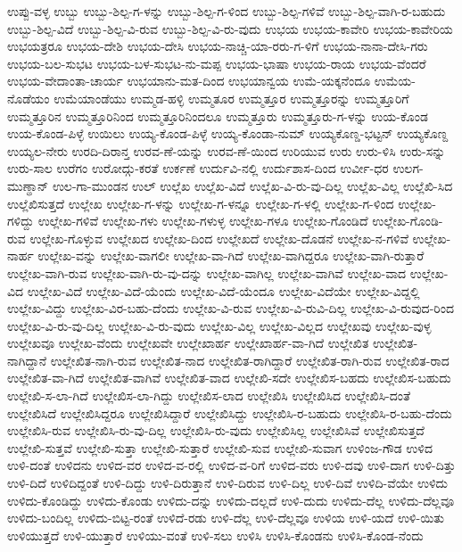 ಉಪ್ಪು-ವಳ್ಳ
ಉಬ್ಬು
ಉಬ್ಬು-ಶಿಲ್ಪ-ಗ-ಳನ್ನು
ಉಬ್ಬು-ಶಿಲ್ಪ-ಗ-ಳಿಂದ
ಉಬ್ಬು-ಶಿಲ್ಪ-ಗಳಿವೆ
ಉಬ್ಬು-ಶಿಲ್ಪ-ವಾಗಿ-ರ-ಬಹುದು
ಉಬ್ಬು-ಶಿಲ್ಪ-ವಿದೆ
ಉಬ್ಬು-ಶಿಲ್ಪ-ವಿ-ರುವ
ಉಬ್ಬು-ಶಿಲ್ಪ-ವಿ-ರು-ವುದು
ಉಭಯ
ಉಭಯ-ಕಾವೇರಿ
ಉಭಯ-ಕಾವೇರಿಯ
ಉಭಯತ್ರರೂ
ಉಭಯ-ದೇಶಿ
ಉಭಯ-ದೇಸಿ
ಉಭಯ-ನಾಚ್ಚಿ-ಯಾ-ರರು-ಗ-ಳಿಗೆ
ಉಭಯ-ನಾನಾ-ದೇಸಿ-ಗರು
ಉಭಯ-ಬಲ-ಸುಭಟ
ಉಭಯ-ಬಳ-ಸುಭಟ-ನು-ಮಪ್ಪ
ಉಭಯ-ಭಾಷಾ
ಉಭಯ-ರಾಯ
ಉಭಯ-ವೆಂದರೆ
ಉಭಯ-ವೇದಾಂತಾ-ಚಾರ್ಯ
ಉಭಯಾನು-ಮತ-ದಿಂದ
ಉಭಯಾನ್ವಯ
ಉಮೆ-ಯಕ್ಕನೆಂದೂ
ಉಮೆಯ-ನೊಡೆಯಂ
ಉಮೆಯಾಂಡೆಯು
ಉಮ್ಮಡ-ಹಳ್ಳಿ
ಉಮ್ಮತೂರ
ಉಮ್ಮತ್ತೂರ
ಉಮ್ಮತ್ತೂರನ್ನು
ಉಮ್ಮತ್ತೂರಿಗೆ
ಉಮ್ಮತ್ತೂರಿನ
ಉಮ್ಮತ್ತೂರಿನಿಂದ
ಉಮ್ಮತ್ತೂರಿನಿಂದಲೂ
ಉಮ್ಮತ್ತೂರು
ಉಮ್ಮತ್ತೂರು-ಗ-ಳನ್ನು
ಉಯ-ಕೊಂಡ
ಉಯ-ಕೊಂಡ-ಪಿಳ್ಳೆ
ಉಯಿಲು
ಉಯ್ಯ-ಕೊಂಡ-ಪಿಳ್ಳೆ
ಉಯ್ಯ-ಕೊಂಡಾ-ನುಮ್
ಉಯ್ಯಕೊಣ್ಡ-ಭಟ್ಟನ್
ಉಯ್ಯಕೊಣ್ದ
ಉಯ್ಯಲ-ನೇರು
ಉರದಿ-ದಿರಾನ್ತ
ಉರವ-ಣೆ-ಯನ್ನು
ಉರವ-ಣೆ-ಯಿಂದ
ಉರಿಯುವ
ಉರು
ಉರು-ಳಿಸಿ
ಉರು-ಸನ್ನು
ಉರು-ಸಾಲ
ಉರೆಗಂ
ಉರೋದ್ಗು-ಕರತೆ
ಉರ್ಕಣೆ
ಉರ್ದುವಿ-ನಲ್ಲಿ
ಉರ್ದುಶಾಸ-ದಿಂದ
ಉರ್ವೀ-ಧರ
ಉಲಗ-ಮುಣ್ಢಾನ್
ಉಲ-ಗಾ-ಮುಂಡನ
ಉಲ್
ಉಲ್ಲೆಖ
ಉಲ್ಲೆಖ-ವಿದೆ
ಉಲ್ಲೆಖ-ವಿ-ರು-ವು-ದಿಲ್ಲ
ಉಲ್ಲೆಖ-ವಿಲ್ಲ
ಉಲ್ಲೆಖಿ-ಸಿದ
ಉಲ್ಲೆಖಿಸುತ್ತದೆ
ಉಲ್ಲೇಖ
ಉಲ್ಲೇಖ-ಗ-ಳನ್ನು
ಉಲ್ಲೇಖ-ಗ-ಳನ್ನೂ
ಉಲ್ಲೇಖ-ಗ-ಳಲ್ಲಿ
ಉಲ್ಲೇಖ-ಗ-ಳಿಂದ
ಉಲ್ಲೇಖ-ಗಳಿದ್ದು
ಉಲ್ಲೇಖ-ಗಳಿವೆ
ಉಲ್ಲೇಖ-ಗಳು
ಉಲ್ಲೇಖ-ಗಳುಳ್ಳ
ಉಲ್ಲೇಖ-ಗಳೂ
ಉಲ್ಲೇಖ-ಗೊಂಡಿದೆ
ಉಲ್ಲೇಖ-ಗೊಂಡಿ-ರುವ
ಉಲ್ಲೇಖ-ಗೊಳ್ಳುವ
ಉಲ್ಲೇಖದ
ಉಲ್ಲೇಖ-ದಿಂದ
ಉಲ್ಲೇಖದೆ
ಉಲ್ಲೇಖ-ದೊಡನೆ
ಉಲ್ಲೇಖ-ನ-ಗಳಿವೆ
ಉಲ್ಲೇಖ-ನಾರ್ಹ
ಉಲ್ಲೇಖ-ವನ್ನು
ಉಲ್ಲೇಖ-ವಾಗಲೀ
ಉಲ್ಲೇಖ-ವಾ-ಗಿದೆ
ಉಲ್ಲೇಖ-ವಾಗಿದ್ದರೂ
ಉಲ್ಲೇಖ-ವಾಗಿ-ರುತ್ತಾರೆ
ಉಲ್ಲೇಖ-ವಾಗಿ-ರುವ
ಉಲ್ಲೇಖ-ವಾಗಿ-ರು-ವು-ದನ್ನು
ಉಲ್ಲೇಖ-ವಾಗಿಲ್ಲ
ಉಲ್ಲೇಖ-ವಾಗಿವೆ
ಉಲ್ಲೇಖ-ವಾದ
ಉಲ್ಲೇಖ-ವಿದ
ಉಲ್ಲೇಖ-ವಿದೆ
ಉಲ್ಲೇಖ-ವಿದೆ-ಯೆಂದು
ಉಲ್ಲೇಖ-ವಿದೆ-ಯೆಂದೂ
ಉಲ್ಲೇಖ-ವಿದೆಯೇ
ಉಲ್ಲೇಖ-ವಿದ್ದಲ್ಲಿ
ಉಲ್ಲೇಖ-ವಿದ್ದು
ಉಲ್ಲೇಖ-ವಿರ-ಬಹು-ದೆಂದು
ಉಲ್ಲೇಖ-ವಿ-ರುವ
ಉಲ್ಲೇಖ-ವಿ-ರುವಿ-ದಿಲ್ಲ
ಉಲ್ಲೇಖ-ವಿ-ರುವುದ-ರಿಂದ
ಉಲ್ಲೇಖ-ವಿ-ರು-ವು-ದಿಲ್ಲ
ಉಲ್ಲೇಖ-ವಿ-ರು-ವುದು
ಉಲ್ಲೇಖ-ವಿಲ್ಲ
ಉಲ್ಲೇಖ-ವಿಲ್ಲದ
ಉಲ್ಲೇಖವು
ಉಲ್ಲೇಖ-ವುಳ್ಳ
ಉಲ್ಲೇಖವೂ
ಉಲ್ಲೇಖ-ವೆಂದು
ಉಲ್ಲೇಖವೇ
ಉಲ್ಲೇಖಾರ್ಹ
ಉಲ್ಲೇಖಾರ್ಹ-ವಾ-ಗಿದೆ
ಉಲ್ಲೇಖಿತ
ಉಲ್ಲೇಖಿತ-ನಾಗಿದ್ದಾನೆ
ಉಲ್ಲೇಖಿತ-ನಾಗಿ-ರುವ
ಉಲ್ಲೇಖಿತ-ನಾದ
ಉಲ್ಲೇಖಿತ-ರಾಗಿದ್ದಾರೆ
ಉಲ್ಲೇಖಿತ-ರಾಗಿ-ರುವ
ಉಲ್ಲೇಖಿತ-ರಾದ
ಉಲ್ಲೇಖಿತ-ವಾ-ಗಿದೆ
ಉಲ್ಲೇಖಿತ-ವಾಗಿವೆ
ಉಲ್ಲೇಖಿತ-ವಾದ
ಉಲ್ಲೇಖಿ-ಸದೇ
ಉಲ್ಲೇಖಿಸ-ಬಹದು
ಉಲ್ಲೇಖಿಸ-ಬಹುದು
ಉಲ್ಲೇಖಿ-ಸ-ಲಾ-ಗಿದೆ
ಉಲ್ಲೇಖಿಸ-ಲಾ-ಗಿದ್ದು
ಉಲ್ಲೇಖಿಸ-ಲಾದ
ಉಲ್ಲೇಖಿಸಿ
ಉಲ್ಲೇಖಿಸಿದ
ಉಲ್ಲೇಖಿಸಿ-ದಂತೆ
ಉಲ್ಲೇಖಿಸಿದೆ
ಉಲ್ಲೇಖಿಸಿದ್ದರೂ
ಉಲ್ಲೇಖಿಸಿದ್ದಾರೆ
ಉಲ್ಲೇಖಿಸಿದ್ದು
ಉಲ್ಲೇಖಿಸಿ-ರ-ಬಹುದು
ಉಲ್ಲೇಖಿಸಿ-ರ-ಬಹು-ದೆಂದು
ಉಲ್ಲೇಖಿಸಿ-ರುವ
ಉಲ್ಲೇಖಿಸಿ-ರು-ವು-ದಿಲ್ಲ
ಉಲ್ಲೇಖಿಸಿ-ರು-ವುದು
ಉಲ್ಲೇಖಿಸಿಲ್ಲ
ಉಲ್ಲೇಖಿಸಿವೆ
ಉಲ್ಲೇಖಿಸುತ್ತದೆ
ಉಲ್ಲೇಖಿ-ಸುತ್ತವೆ
ಉಲ್ಲೇಖಿ-ಸುತ್ತಾ
ಉಲ್ಲೇಖಿ-ಸುತ್ತಾರೆ
ಉಲ್ಲೇಖಿ-ಸುವ
ಉಲ್ಲೇಖಿ-ಸುವಾಗ
ಉಳಿಂಜ-ಗೌಡ
ಉಳಿದ
ಉಳಿ-ದಂತೆ
ಉಳಿದನು
ಉಳಿದ-ವರ
ಉಳಿದ-ವ-ರಲ್ಲಿ
ಉಳಿದ-ವ-ರಿಗೆ
ಉಳಿದ-ವರು
ಉಳಿ-ದವು
ಉಳಿ-ದಾಗ
ಉಳಿ-ದಿತ್ತು
ಉಳಿ-ದಿದೆ
ಉಳಿದಿದ್ದಂತೆ
ಉಳಿ-ದಿದ್ದು
ಉಳಿ-ದಿರುತ್ತಾನೆ
ಉಳಿ-ದಿರುವ
ಉಳಿ-ದಿಲ್ಲ
ಉಳಿ-ದಿವೆ
ಉಳಿದಿ-ವೆಯೇ
ಉಳಿದು
ಉಳಿದು-ಕೊಂಡಿದ್ದು
ಉಳಿದು-ಕೊಂಡು
ಉಳಿದು-ದನ್ನು
ಉಳಿದು-ದಲ್ಲದೆ
ಉಳಿ-ದುದು
ಉಳಿದು-ದೆಲ್ಲ
ಉಳಿದು-ದೆಲ್ಲವೂ
ಉಳಿದು-ಬಂದಿಲ್ಲ
ಉಳಿದು-ಬಿಟ್ಟ-ರಂತೆ
ಉಳಿದೆ-ರಡು
ಉಳಿ-ದೆಲ್ಲ
ಉಳಿ-ದೆಲ್ಲವೂ
ಉಳಿಯ
ಉಳಿ-ಯದೆ
ಉಳಿ-ಯಿತು
ಉಳಿಯುತ್ತದೆ
ಉಳಿ-ಯುತ್ತಾರೆ
ಉಳಿಯು-ವಂತೆ
ಉಳಿ-ಸಲು
ಉಳಿಸಿ
ಉಳಿಸಿ-ಕೊಂಡನು
ಉಳಿಸಿ-ಕೊಂಡ-ನೆಂದು
